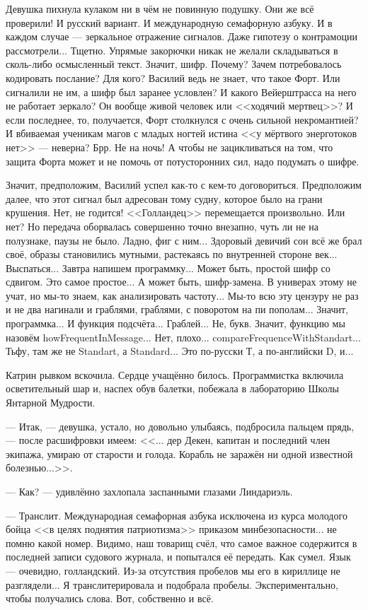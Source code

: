 Девушка пихнула кулаком ни в чём не повинную подушку. Они же всё проверили! И русский вариант.
И международную семафорную азбуку. И в каждом случае --- зеркальное отражение сигналов. Даже гипотезу о контрамоции рассмотрели...
Тщетно. Упрямые закорючки никак не желали складываться в сколь-либо осмысленный текст. Значит, шифр.
Почему? Зачем потребовалось кодировать послание? Для кого? Василий ведь не знает, что такое Форт.
Или сигналили не им, а шифр был заранее условлен? И какого Вейерштрасса на него не работает зеркало?
Он вообще живой человек или <<ходячий мертвец>>?
И если последнее, то, получается, Форт столкнулся с очень сильной некромантией?
И вбиваемая ученикам магов с младых ногтей истина <<у мёртвого энерготоков нет>> --- неверна? Брр. Не на ночь!
А чтобы не зацикливаться на том, что защита Форта может и не помочь от потусторонних сил, надо подумать о шифре.

Значит, предположим, Василий успел как-то с кем-то договориться.
Предположим далее, что этот сигнал был адресован тому судну, которое было на грани крушения. Нет, не годится!
<<Голландец>> перемещается произвольно. Или нет?
Но передача оборвалась совершенно точно внезапно, чуть ли не на полузнаке, паузы не было. Ладно, фиг с ним...
Здоровый девичий сон всё же брал своё, образы становились мутными, растекаясь по внутренней стороне век... Выспаться...
Завтра напишем программку... Может быть, простой шифр со сдвигом. Это самое простое... А может быть, шифр-замена.
В универах этому не учат, но мы-то знаем, как анализировать частоту...
Мы-то всю эту цензуру не раз и не два нагинали и граблями, граблями, с поворотом на пи пополам...
Значит, программка... И функция подсчёта... Граблей... Не, букв. Значит, функцию мы назовём howFrequentInMessage...
Нет, плохо... compareFrequenceWithStandart... Тьфу, там же не Standart, а Standard... Это по-русски Т, а по-английски D, и...

Катрин рывком вскочила. Сердце учащённо билось. Программистка включила осветительный шар и, наспех обув балетки,
побежала в лабораторию Школы Янтарной Мудрости.

\emptypar

--- Итак, --- девушка, устало, но довольно улыбаясь, подбросила пальцем прядь, --- после расшифровки имеем:
<<... дер Декен, капитан и последний член экипажа, умираю от старости и голода.
Корабль не заражён ни одной известной болезнью...>>.

--- Как? --- удивлённо захлопала заспанными глазами Линдариэль.

--- Транслит. Международная семафорная азбука исключена из курса молодого бойца <<в целях поднятия патриотизма>>
приказом минбезопасности... не помню какой номер. Видимо, наш товарищ счёл,
что самое важное содержится в последней записи судового журнала, и попытался её передать.
Как сумел. Язык --- очевидно, голландский. Из-за отсутствия пробелов мы его в кириллице не разглядели...
Я транслитерировала и подобрала пробелы. Экспериментально, чтобы получались слова. Вот, собственно и всё.

